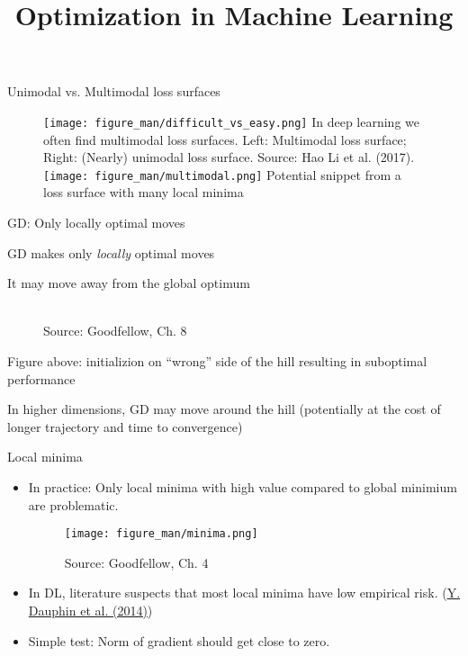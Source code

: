\documentclass[11pt,compress,t,notes=noshow, xcolor=table]{beamer}
\title{Optimization in Machine Learning}
\date{}
\begin{document}
\sloppy

\begin{vbframe}{Unimodal vs. Multimodal loss surfaces}
\begin{figure}
\centering
\texttt{[image: figure\_man/difficult\_vs\_easy.png]}
\footnotesize{In deep learning we often find multimodal loss surfaces. Left: Multimodal loss surface; Right: (Nearly) unimodal loss surface. Source: Hao Li et al. (2017). }
\centering
\vspace{1cm}
\texttt{[image: figure\_man/multimodal.png]}
\footnotesize{Potential snippet from a loss surface with many local minima}
\end{figure}

\end{vbframe}


\begin{frame} {GD: Only locally optimal moves}
\begin{itemize}
\small{
\item GD makes only \textit{locally} optimal moves
\item It may move away from the global optimum
\begin{figure}
	\centering
	\tiny{\\Source: Goodfellow, Ch. 8}
\end{figure}
\item Figure above: initializion on ``wrong'' side of the hill resulting in suboptimal performance
\item In higher dimensions, GD may move around the hill (potentially at the cost of longer trajectory and time to convergence)}
\end{itemize}
\end{frame}

\begin{vbframe} {Local minima}

\begin{itemize}
\item In practice: Only local minima with high value compared to global minimium are problematic.
\begin{figure}
\begin{center}
	\texttt{[image: figure\_man/minima.png]}
\end{center}
\tiny{Source: Goodfellow, Ch. 4}
\end{figure}
\item In DL, literature suspects that most local minima have low empirical risk. (\href{https://arxiv.org/abs/1406.2572}{Y. Dauphin et al. (2014)})
\item Simple test: Norm of gradient should get close to zero.
\end{itemize}
\end{vbframe}
\end{document}

